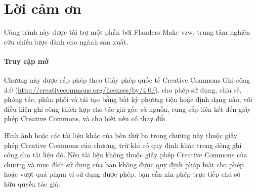 \section*{Lời cảm ơn}
Công trình này được tài trợ một phần bởi Flanders Make vzw, trung tâm nghiên cứu chiến lược dành cho ngành sản xuất.

\paragraph{Truy cập mở}
Chương này được cấp phép theo Giấy phép quốc tế Creative Commons Ghi công 4.0 (\url{http://creativecommons.org/licenses/by/4.0/}), cho phép sử dụng, chia sẻ, phóng tác, phân phối và tái tạo bằng bất kỳ phương tiện hoặc định dạng nào, với điều kiện ghi công thích hợp cho tác giả gốc và nguồn, cung cấp liên kết đến giấy phép Creative Commons, và cho biết nếu có thay đổi.

Hình ảnh hoặc các tài liệu khác của bên thứ ba trong chương này thuộc giấy phép Creative Commons của chương, trừ khi có quy định khác trong dòng ghi công cho tài liệu đó. Nếu tài liệu không thuộc giấy phép Creative Commons của chương và mục đích sử dụng của bạn không được quy định pháp luật cho phép hoặc vượt quá phạm vi sử dụng được phép, bạn cần xin phép trực tiếp chủ sở hữu quyền tác giả.
